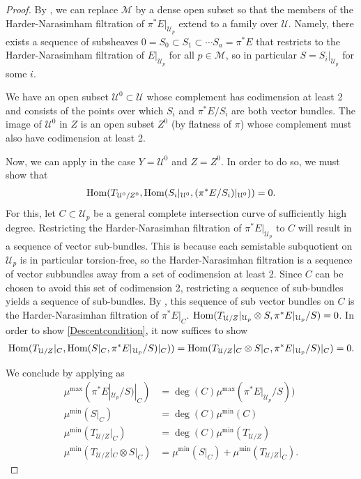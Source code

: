 \documentclass[11pt,reqno]{amsart}
\theoremstyle{plain}
\theoremstyle{definition}
\theoremstyle{remark}
\numberwithin{equation}{section}
\numberwithin{equation}{section}
\newcommand{\cM}{\mathcal{M}}
\newcommand{\cU}{\mathcal{U}}
\begin{document}
\begin{proof}
By \cite[Lemmas 5 and 7]{S77}, we can replace $\cM$ by a dense open subset so that the members of the Harder-Narasimham filtration of $\pi^{*}E|_{\cU_p}$ extend to a family over $\cU$. %
Namely, there exists a sequence of subsheaves $0=S_0\subset S_1\subset \cdots S_a= \pi^{*}E$ that restricts to the Harder-Narasimham filtration of $E|_{\cU_p}$ for all $p\in \cM$, so in particular $S=S_i|_{\cU_p}$ for some $i$.

We have an open subset $\cU^0\subset \cU$ whose complement has codimension at least 2 and consists of the points over which $S_i$ and $\pi^{*}E/S_i$ are both vector bundles. The image of $\cU^0$ in $Z$ is an open subset $Z^0$ (by flatness of $\pi$) whose complement must also have  codimension at least 2.

Now, we can apply  in the case $Y=\cU^0$ and $Z=Z^0$. In order to do so, we must show that
\begin{align}\label{Descentcondition}
    \Hom(T_{\cU^0/Z^0},\Hom(S_i|_{\cU^0},(\pi^{*}E/S_i)|_{\cU^0}))=0.
\end{align}
For this, let $C \subset \cU_{p}$ be a general complete intersection curve of sufficiently high degree. Restricting the Harder-Narasimhan filtration of $\pi^{*}E|_{\cU_p}$ to $C$ will result in a sequence of vector sub-bundles. This is because each semistable subquotient on $\cU_{p}$ is in particular torsion-free, so the Harder-Narasimhan filtration is a sequence of vector subbundles away from a set of codimension at least 2. Since $C$ can be chosen to avoid this set of codimension 2, restricting a sequence of sub-bundles yields a sequence of sub-bundles. By \cite{MR81}, this sequence of sub vector bundles on $C$ is the Harder-Narasimhan filtration of $\pi^{*}E|_{C}$.  $\Hom(T_{\cU/Z}|_{\cU_p}\otimes S,\pi^{*}E|_{\cU_p}/S)=0$.   In order to show \eqref{Descentcondition}, it now suffices to show
\begin{align*}
    \Hom(T_{\cU/Z}|_{C},\Hom(S|_C,\pi^{*}E|_{\cU_p}/S)|_C))=\Hom(T_{\cU/Z}|_{C}\otimes S|_C,\pi^{*}E|_{\cU_p}/S)|_C)=0.
\end{align*}

We conclude by applying  as
\begin{align*}
    \mu^{\max}(\pi^{*}E|_{\cU_p}/S)|_C) &= \deg(C) \mu^{\max}(\pi^{*}E|_{\cU_p}/S))\\
    \mu^{\min}(S|_C) &= \deg(C) \mu^{\min}(C)\\
    \mu^{\min}(T_{\cU/Z}|_{C}) &= \deg(C) \mu^{\min}(T_{\cU/Z})\\
    \mu^{\min}(T_{\cU/Z}|_{C}\otimes S|_{C}) &= \mu^{\min}(S|_C) + \mu^{\min}(T_{\cU/Z}|_{C}).
\end{align*}
\end{proof}
\end{document}
